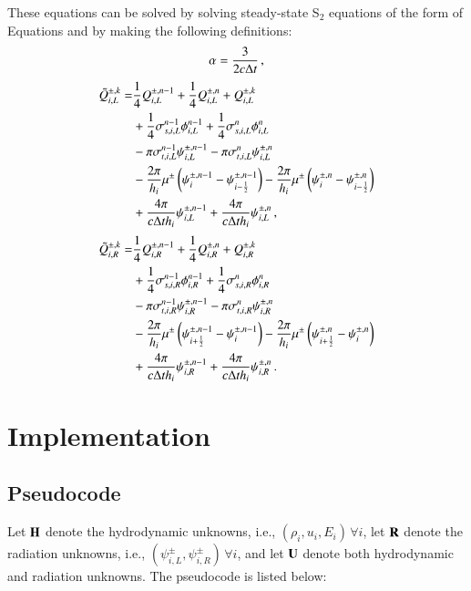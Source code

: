 \documentclass[preprint,12pt]{elsarticle}
\begin{document}
These equations can be solved by solving steady-state S$_2$ equations
of the form of Equations  and  by making
the following definitions:
\begin{equation}
\alpha = \frac{3}{2c\Delta t} \, ,
\end{equation}
\begin{equation}\begin{split}
\tilde{Q}_{i,L}^{\pm,k} = &
    \frac{1}{4} Q_{i,L}^{\pm,n-1} + \frac{1}{4} Q_{i,L}^{\pm,n} + Q_{i,L}^{\pm,k}\\
& + \frac{1}{4}\sigma_{s,i,L}^{n-1}\phi_{i,L}^{n-1} + \frac{1}{4}\sigma_{s,i,L}^n\phi_{i,L}^n \\
& - \pi\sigma_{t,i,L}^{n-1}\psi_{i,L}^{\pm,n-1} - \pi\sigma_{t,i,L}^{n}\psi_{i,L}^{\pm,n} \\
& - \frac{2\pi}{h_i}\mu^\pm\left( \psi^{\pm,n-1}_i - \psi^{\pm,n-1}_{i-\frac{1}{2}} \right)
  - \frac{2\pi}{h_i}\mu^\pm\left( \psi^{\pm,n}_i - \psi^{\pm,n}_{i-\frac{1}{2}} \right) \\
& + \frac{4\pi}{c\Delta t h_i}\psi_{i,L}^{\pm,n-1} + \frac{4\pi}{c\Delta t h_i}\psi_{i,L}^{\pm,n} \, ,
\end{split}\end{equation}
\begin{equation}\begin{split}
\tilde{Q}_{i,R}^{\pm,k} = &
    \frac{1}{4} Q_{i,R}^{\pm,n-1} + \frac{1}{4} Q_{i,R}^{\pm,n} + Q_{i,R}^{\pm,k}\\
& + \frac{1}{4}\sigma_{s,i,R}^{n-1}\phi_{i,R}^{n-1} + \frac{1}{4}\sigma_{s,i,R}^n\phi_{i,R}^n \\
& - \pi\sigma_{t,i,R}^{n-1}\psi_{i,R}^{\pm,n-1} - \pi\sigma_{t,i,R}^{n}\psi_{i,R}^{\pm,n} \\
& - \frac{2\pi}{h_i}\mu^\pm\left( \psi^{\pm,n-1}_{i+\frac{1}{2}} - \psi^{\pm,n-1}_{i} \right)
  - \frac{2\pi}{h_i}\mu^\pm\left( \psi^{\pm,n}_{i+\frac{1}{2}} - \psi^{\pm,n}_{i} \right) \\
& + \frac{4\pi}{c\Delta t h_i}\psi_{i,R}^{\pm,n-1} + \frac{4\pi}{c\Delta t h_i}\psi_{i,R}^{\pm,n} \, .
\end{split}\end{equation}

\section{Implementation}
\subsection{Pseudocode}
Let $\mathbf{H}$ denote the hydrodynamic unknowns, i.e., $(\rho_i,u_i,E_i)\,\forall i$,
let $\mathbf{R}$ denote the radiation unknowns, i.e., $(\psi_{i,L}^\pm,\psi_{i,R}^\pm)
\,\forall i$, and let $\mathbf{U}$ denote both hydrodynamic and radiation
unknowns. The pseudocode is listed below:
\end{document}
